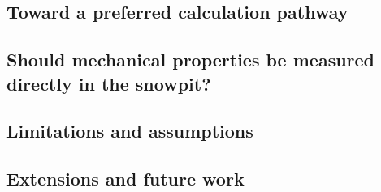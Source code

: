 \documentclass[hess, manuscript]{copernicus}
\begin{document}
\subsection{Toward a preferred calculation pathway}
\label{sec:discussion_best_pathway}


\subsection{Should mechanical properties be measured directly in the snowpit?}
\label{sec:discussion_direct_measurement}

\subsection{Limitations and assumptions}
\label{sec:limitations}




\subsection{Extensions and future work}
\label{sec:extensions}
\end{document}
